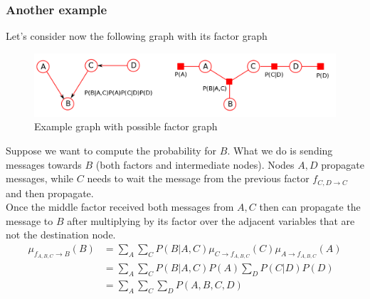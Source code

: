         \subsubsection{Another example}
            Let's consider now the following graph with its factor graph
            \begin{figure}[ht]
                \centering
                \includegraphics[scale=0.3]{images/inference example with evidence.png}
                \caption{Example graph with possible factor graph}
                \label{fig:inference_graph_evidence}
            \end{figure}
            Suppose we want to compute the probability for $B$. What we do is sending messages towards $B$ (both factors and intermediate nodes). Nodes $A, D$ propagate messages, while $C$ needs to wait the message from the previous factor $f_{C, D \rightarrow C}$ and then propagate.\\
            Once the middle factor received both messages from $A, C$ then can propagate the message to $B$ after multiplying by its factor over the adjacent variables that are not the destination node.
            \begin{align*}
                \mu_{f_{A, B, C} \rightarrow B} (B) &= \sum_{A} \sum_{C} P(B|A, C) \mu_{C \rightarrow f_{A, B, C}}(C) \mu_{A \rightarrow f_{A, B, C}} (A)\\
                & = \sum_{A} \sum_{C} P(B|A, C) P(A) \sum_{D} P(C|D) P(D)\\
                &= \sum_{A} \sum_{C}\sum_{D} P(A, B, C, D)
            \end{align*}
        
